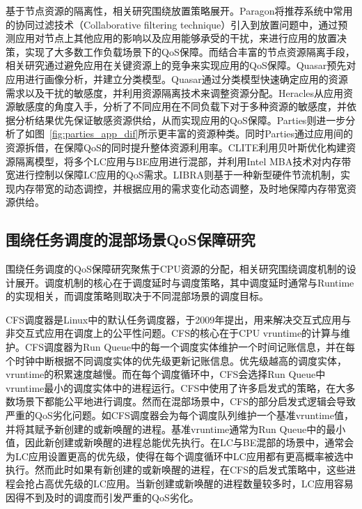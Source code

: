 基于节点资源的隔离性，相关研究围绕放置策略展开。Paragon\citep{delimitrou2013paragon}将推荐系统中常用的协同过滤技术（Collaborative filtering technique）引入到放置问题中，通过预测应用对节点上其他应用的影响以及应用能够承受的干扰，来进行应用的放置决策，实现了大多数工作负载场景下的QoS保障。而结合丰富的节点资源隔离手段，相关研究通过避免应用在关键资源上的竞争来实现应用的QoS保障。Quasar\citep{delimitrou2014quasar}预先对应用进行画像分析，并建立分类模型。Quasar通过分类模型快速确定应用的资源需求以及干扰的敏感度，并利用资源隔离技术来调整资源分配。Heracles\citep{lo2015heracles}从应用资源敏感度的角度入手，分析了不同应用在不同负载下对于多种资源的敏感度，并依据分析结果优先保证敏感资源供给，从而实现应用的QoS保障。Parties\citep{chen2019parties}则进一步分析了如图~\ref{fig:parties_app_dif}所示更丰富的资源种类。同时Parties通过应用间的资源拆借，在保障QoS的同时提升整体资源利用率。CLITE\citep{patel2020clite}利用贝叶斯优化构建资源隔离模型，将多个LC应用与BE应用进行混部，并利用Intel MBA技术对内存带宽进行控制以保障LC应用的QoS需求。LIBRA\citep{zhang2021libra}则基于一种新型硬件节流机制，实现内存带宽的动态调控，并根据应用的需求变化动态调整，及时地保障内存带宽资源供给。

\subsection{围绕任务调度的混部场景QoS保障研究}


围绕任务调度的QoS保障研究聚焦于CPU资源的分配，相关研究围绕调度机制的设计展开。调度机制的核心在于调度延时与调度策略，其中调度延时通常与Runtime的实现相关，而调度策略则取决于不同混部场景的调度目标。

CFS调度器\citep{pabla2009completely}是Linux中的默认任务调度器，于2009年提出，用来解决交互式应用与非交互式应用在调度上的公平性问题。CFS的核心在于CPU vruntime的计算与维护。CFS调度器为Run Queue中的每一个调度实体维护一个时间记账信息，并在每个时钟中断根据不同调度实体的优先级更新记账信息。优先级越高的调度实体，vruntime的积累速度越慢。而在每个调度循环中，CFS会选择Run Queue中vruntime最小的调度实体中的进程运行。CFS中使用了许多启发式的策略，在大多数场景下都能公平地进行调度。然而在混部场景中，CFS的部分启发式逻辑会导致严重的QoS劣化问题。如CFS调度器会为每个调度队列维护一个基准vruntime值，并将其赋予新创建的或新唤醒的进程。基准vruntime通常为Run Queue中的最小值，因此新创建或新唤醒的进程总能优先执行。在LC与BE混部的场景中，通常会为LC应用设置更高的优先级，使得在每个调度循环中LC应用都有更高概率被选中执行。然而此时如果有新创建的或新唤醒的进程，在CFS的启发式策略中，这些进程会抢占高优先级的LC应用。当新创建或新唤醒的进程数量较多时，LC应用容易因得不到及时的调度而引发严重的QoS劣化。

